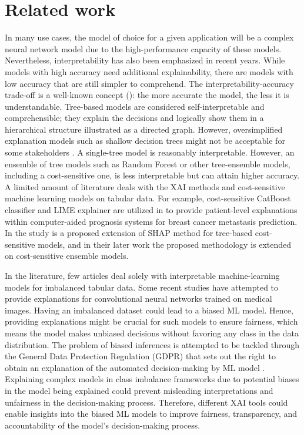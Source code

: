 \section{Related work}
In many use cases, the model of choice for a given application will be a complex neural network model due to the high-performance capacity of these models. Nevertheless, interpretability has also been emphasized in recent years. While models with high accuracy need additional explainability, there are models with low accuracy that are still simpler to comprehend. The interpretability-accuracy trade-off is a well-known concept (\cite{Rivera2024, ribeiro2016, darpa, RizzoL18Explainability}): the more accurate the model, the less it is understandable. Tree-based models are considered \cite{ali} self-interpretable and comprehensible; they explain the decisions and logically show them in a hierarchical structure illustrated as a directed graph. However, oversimplified explanation models such as shallow decision trees might not be acceptable for some stakeholders \citep{freitas}. A single-tree model is reasonably interpretable. However, an ensemble of tree models such as Random Forest \citep{RF} or other tree-ensemble models, including a cost-sensitive one, is less interpretable but can attain higher accuracy. A limited amount of literature deals with the XAI methods and cost-sensitive machine learning models on tabular data. For example, cost-sensitive CatBoost classifier and LIME explainer are utilized in \citep{Maouche2023} to provide patient-level explanations within computer-aided prognosis systems for breast cancer metastasis prediction. In the study \citep{kopanja2023} is a proposed extension of SHAP method \citep{shap} for tree-based cost-sensitive models, and in their later work \citep{kopanja} the proposed methodology is extended on cost-sensitive ensemble models. 

In the literature, few articles deal solely with interpretable machine-learning models for imbalanced tabular data. Some recent studies \citep{Mustari2023, Dablain2023} have attempted to provide explanations for convolutional neural networks trained on medical images. Having an imbalanced dataset could lead to a biased ML model. Hence, providing explanations might be crucial for such models to ensure fairness, which means the model makes unbiased decisions without favoring any class in the data distribution. The problem of biased inferences is attempted to be tackled through the General Data Protection Regulation (GDPR) that sets out the right to obtain an explanation of the automated decision-making by ML model \citep{vilone_review}. Explaining complex models in class imbalance frameworks due to potential biases in the model being explained could prevent misleading interpretations and unfairness in the decision-making process. Therefore, different XAI tools could enable insights into the biased ML models to improve fairness, transparency, and accountability of the model's decision-making process.

